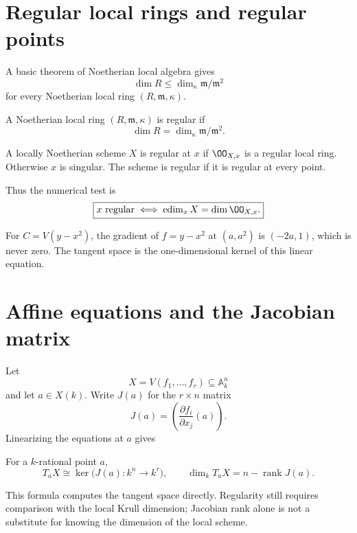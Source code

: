 \section{Regular local rings and regular points}\label{sec:vi32-regular}
A basic theorem of Noetherian local algebra gives
\[
 \dim R\leq\dim_\kappa\mathfrak m/\mathfrak m^2
\]
for every Noetherian local ring $(R,\mathfrak m,\kappa)$.
\begin{definition}\label{def:vi32-regular-local}
A Noetherian local ring $(R,\mathfrak m,\kappa)$ is regular if
\[
 \dim R=\dim_\kappa\mathfrak m/\mathfrak m^2.
\]
\end{definition}
\begin{definition}\label{def:vi32-regular-point}
A locally Noetherian scheme $X$ is regular at $x$ if $\OO_{X,x}$ is a regular local ring. Otherwise $x$ is singular.
The scheme is regular if it is regular at every point.
\end{definition}
Thus the numerical test is
\[
 \boxed{x\text{ regular}\iff \operatorname{edim}_xX=\dim\OO_{X,x}.}
\]


\begin{example}\label{ex:vi32-expand-02}
For $C=V(y-x^2)$, the gradient of $f=y-x^2$ at $(a,a^2)$ is $(-2a,1)$, which is never zero.  The tangent space is the one-dimensional kernel of this linear equation.
\end{example}
\section{Affine equations and the Jacobian matrix}\label{sec:vi32-jacobian}
Let
\[
 X=V(f_1,\ldots,f_r)\subseteq\mathbb A^n_k
\]
and let $a\in X(k)$.  Write $J(a)$ for the $r\times n$ matrix
\[
 J(a)=\left(\frac{\partial f_i}{\partial x_j}(a)\right).
\]
Linearizing the equations at $a$ gives
\begin{proposition}\label{prop:vi32-jacobian-tangent}
For a $k$-rational point $a$,
\[
 T_aX\cong\ker\bigl(J(a):k^n\to k^r\bigr),
 \qquad
 \dim_k T_aX=n-\operatorname{rank}J(a).
\]
\end{proposition}
This formula computes the tangent space directly.  Regularity still requires comparison with the local Krull dimension;
Jacobian rank alone is not a substitute for knowing the dimension of the local scheme.


